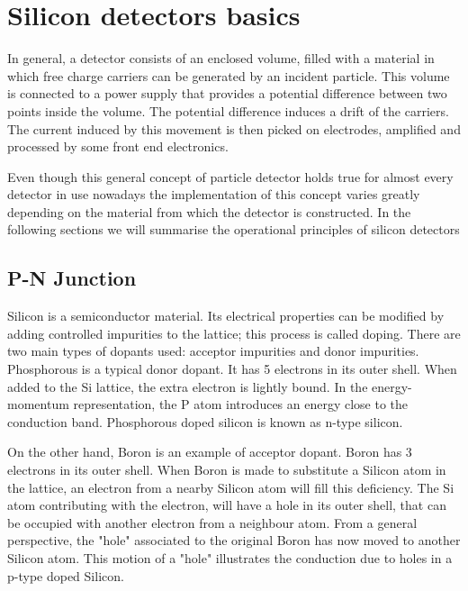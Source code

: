 \chapter{Silicon detectors basics} %
\label{cha:simulator_development}

In general, a detector consists of an enclosed volume, filled with a material in
which free charge carriers can be generated by an incident particle. This volume
is connected to a power supply that provides a  potential difference between two
points inside the volume. The potential difference induces a drift of the
carriers. The current induced by this movement is then picked on electrodes,
amplified and processed by some front end electronics.

Even though this general concept of particle detector holds true for almost
every detector in use nowadays the implementation of this concept varies greatly
depending on the material from which the detector is constructed. In the
following sections we will summarise the operational principles of silicon
detectors

\section{P-N Junction}

Silicon is a semiconductor material. Its electrical properties can be modified
by adding controlled impurities to the lattice; this process is called doping.
There are two main types of dopants used: acceptor impurities and donor
impurities. Phosphorous is a typical donor dopant. It has 5 electrons in its
outer shell. When added to the Si lattice, the extra electron is lightly bound.
In the energy-momentum representation, the P atom introduces an energy close to
the conduction band. Phosphorous doped silicon is known as n-type silicon. 

On the other hand, Boron is an example of acceptor dopant. Boron has 3 electrons
in its outer shell. When Boron is made to substitute a Silicon atom in the
lattice, an electron from a nearby Silicon atom will fill this deficiency. The
Si atom contributing with the electron, will have a hole in its outer shell,
that can be occupied with another electron from a neighbour atom. From a general
perspective, the "hole" associated to the original Boron has now moved to
another Silicon atom. This motion of a "hole" illustrates the conduction due to
holes in a p-type doped Silicon.

